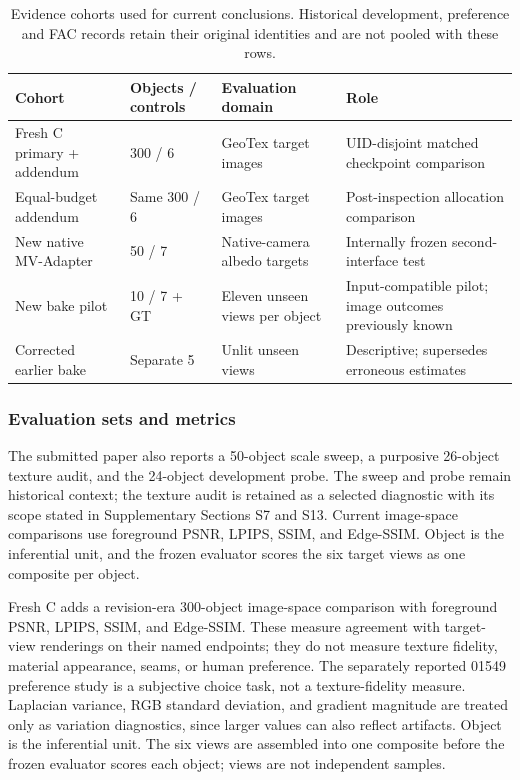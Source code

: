 \documentclass[times,twocolumn,final]{elsarticle}
\begin{document}
\begin{table}[t]\centering\scriptsize
\caption{Evidence cohorts used for current conclusions. Historical development, preference and FAC records retain their original identities and are not pooled with these rows.}
\label{tab:cohort-map}
\begin{tabular}{llll}
\toprule Cohort & Objects / controls & Evaluation domain & Role \\
\midrule
Fresh C primary + addendum & 300 / 6 & GeoTex target images & UID-disjoint matched checkpoint comparison \\
Equal-budget addendum & Same 300 / 6 & GeoTex target images & Post-inspection allocation comparison \\
New native MV-Adapter & 50 / 7 & Native-camera albedo targets & Internally frozen second-interface test \\
New bake pilot & 10 / 7 + GT & Eleven unseen views per object & Input-compatible pilot; image outcomes previously known \\
Corrected earlier bake & Separate 5 & Unlit unseen views & Descriptive; supersedes erroneous estimates \\
\bottomrule\end{tabular}
\end{table}

\subsubsection{Evaluation sets and metrics}

The submitted paper also reports a 50-object scale sweep, a purposive 26-object texture audit, and the 24-object development probe. The sweep and probe remain historical context; the texture audit is retained as a selected diagnostic with its scope stated in Supplementary Sections S7 and S13. Current image-space comparisons use foreground PSNR, LPIPS, SSIM, and Edge-SSIM. Object is the inferential unit, and the frozen evaluator scores the six target views as one composite per object.

Fresh C adds a revision-era 300-object image-space comparison with foreground PSNR, LPIPS, SSIM, and Edge-SSIM. These measure agreement with target-view renderings on their named endpoints; they do not measure texture fidelity, material appearance, seams, or human preference. The separately reported 01549 preference study is a subjective choice task, not a texture-fidelity measure. Laplacian variance, RGB standard deviation, and gradient magnitude are treated only as variation diagnostics, since larger values can also reflect artifacts. Object is the inferential unit. The six views are assembled into one composite before the frozen evaluator scores each object; views are not independent samples.
\end{document}
